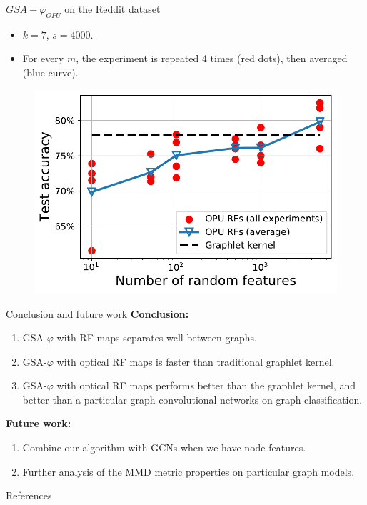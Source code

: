 \documentclass{beamer}
\begin{document}
\begin{frame}{$GSA-\varphi_{OPU}$ on the Reddit dataset }
	\begin{itemize}
		\item $k=7$, $s=4000$. 
		\item For every $m$, the experiment is repeated 4 times (red dots), then  averaged (blue curve).
	\end{itemize}
\begin{figure}[H]
\centering
\includegraphics[scale=0.4]{figs/reddit.pdf}
\end{figure}
\end{frame}

\begin{frame}{Conclusion and future work }
\footnotesize
\textbf{Conclusion:}
\begin{enumerate}
    \item GSA-$\varphi$ with RF maps separates well between graphs. 
    \item GSA-$\varphi$ with optical RF maps is  faster than traditional graphlet kernel.
    \item GSA-$\varphi$ with optical RF maps performs better than the graphlet kernel, and better than a particular graph convolutional networks on graph classification.
\end{enumerate}
\vfill
\textbf{Future work:}
\begin{enumerate}
    \item  Combine our algorithm with GCNs when we have node features.
    \item Further analysis of the MMD metric properties on particular graph models. 
\end{enumerate}

\end{frame}{}


\begin{frame}[allowframebreaks]{References}
	\nocite{*}
	\footnotesize
	
\end{frame}
\end{document}
